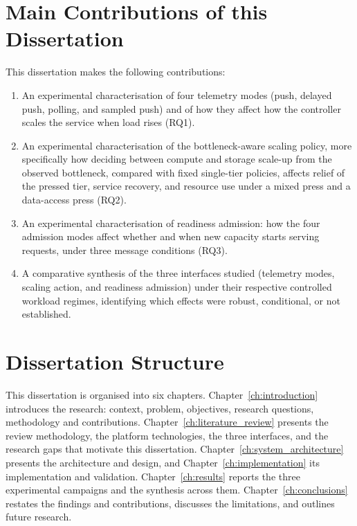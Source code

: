 ﻿\documentclass[12pt,reqno,twoside]{amsbook}
\begin{document}
\section{Main Contributions of this Dissertation}\label{sec:contributions} %
This dissertation makes the following contributions:

\begin{enumerate}
    \item An experimental characterisation of four telemetry modes (push,
    delayed push, polling, and sampled push) and of how they affect how the
    controller scales the service when load rises (RQ1).
    \item An experimental characterisation of the bottleneck-aware scaling
    policy, more specifically how deciding between compute and storage
    scale-up from the observed bottleneck, compared with fixed single-tier
    policies, affects relief of the pressed tier, service recovery, and
    resource use under a mixed press and a data-access press (RQ2).
    \item An experimental characterisation of readiness admission: how the
    four admission modes affect whether and when new capacity starts serving
    requests, under three message conditions (RQ3).
    \item A comparative synthesis of the three interfaces studied
    (telemetry modes, scaling action, and readiness admission)
    under their respective controlled workload regimes, identifying which
    effects were robust, conditional, or not established.
\end{enumerate}

\section{Dissertation Structure}\label{sec:document_structure} %
This dissertation is organised into six chapters.
Chapter~\ref{ch:introduction} introduces the research: context, problem,
objectives, research questions, methodology and contributions.
Chapter~\ref{ch:literature_review} presents the review methodology, the
platform technologies, the three interfaces, and the research gaps that
motivate this dissertation. Chapter~\ref{ch:system_architecture} presents the
architecture and design, and Chapter~\ref{ch:implementation} its
implementation and validation. Chapter~\ref{ch:results} reports the three
experimental campaigns and the synthesis across them.
Chapter~\ref{ch:conclusions} restates the findings and contributions,
discusses the limitations, and outlines future research.
\end{document}
